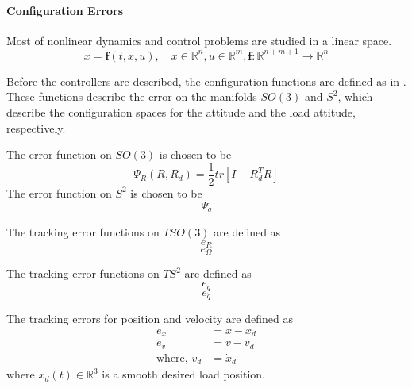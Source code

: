 \paragraph{Configuration Errors}
Most of nonlinear dynamics and control problems are studied in a linear space.\\
\begin{equation}\label{key}
\dot{x}=\textbf{f}(t,x,u), \quad x\in\mathbb{R}^n, u\in\mathbb{R}^m, \textbf{f}:\mathbb{R}^{n+m+1}\rightarrow\mathbb{R}^n
\end{equation}

Before the controllers are described, the configuration functions are defined as in \cite{Bullo2005}. These functions describe the error on the manifolds $ SO(3) $ and $ S^2 $, which describe the configuration spaces for the  attitude and the load attitude, respectively.


The error function on $ SO(3) $ is chosen to be \cite{Lee2010}
\begin{equation}\label{eq:errorfunc}
\Psi_R(R,R_d)=\frac{1}{2}tr\left[I-R_d^TR\right]
\end{equation}
The error function on $ S^2 $ is chosen to be 
\begin{equation}\label{key}
\Psi_q
\end{equation}


The tracking error functions on $ TSO(3) $ are defined as
\begin{equation}\label{key}
e_R
\end{equation}
\begin{equation}\label{key}
e_\Omega 
\end{equation}

The tracking error functions on $ TS^2$ are defined as
\begin{equation}\label{key}
e_q
\end{equation}
\begin{equation}\label{key}
e_{\dot{q}} 
\end{equation}

The tracking errors for position and velocity are defined as
\begin{align}\label{key}
e_x&=x-x_d\\
e_v&=v-v_d\\
\text{where, }v_d&=\dot{x}_d
\end{align}
where $ x_d(t) \in \mathbb{R}^3$ is a smooth desired load position.

